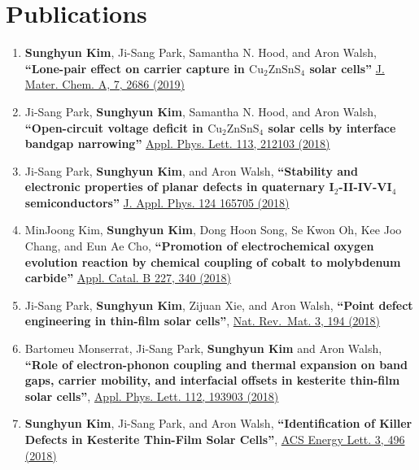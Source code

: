 \section{Publications}\label{publications}

\begin{enumerate}
\def\labelenumi{\arabic{enumi}.}
\item
  \textbf{Sunghyun Kim}, Ji-Sang Park, Samantha N. Hood, and Aron Walsh,
  \textbf{``Lone-pair effect on carrier capture in
  \(\boldsymbol{\mathrm{Cu_{2}ZnSnS_{4}}}\) solar cells''}
  \href{https://pubs.rsc.org/en/content/articlelanding/2019/ta/c8ta10130b}{J.
  Mater. Chem. A, 7, 2686 (2019)}
\item
  Ji-Sang Park, \textbf{Sunghyun Kim}, Samantha N. Hood, and Aron Walsh,
  \textbf{``Open-circuit voltage deficit in
  \(\boldsymbol{\mathrm{Cu_{2}ZnSnS_{4}}}\) solar cells by interface
  bandgap narrowing''}
  \href{https://aip.scitation.org/doi/abs/10.1063/1.5063793}{Appl. Phys.
  Lett. 113, 212103 (2018)}
\item
  Ji-Sang Park, \textbf{Sunghyun Kim}, and Aron Walsh,
  \textbf{``Stability and electronic properties of planar defects in
  quaternary I\(_2\)-II-IV-VI\(_4\) semiconductors''}
  \href{https://doi.org/10.1063/1.5053424}{J. Appl. Phys. 124 165705
  (2018)}
\item
  MinJoong Kim, \textbf{Sunghyun Kim}, Dong Hoon Song, Se Kwon Oh, Kee
  Joo Chang, and Eun Ae Cho, \textbf{``Promotion of electrochemical
  oxygen evolution reaction by chemical coupling of cobalt to molybdenum
  carbide''} \href{https://doi.org/10.1016/j.apcatb.2018.01.051}{Appl.
  Catal. B 227, 340 (2018)}
\item
  Ji-Sang Park, \textbf{Sunghyun Kim}, Zijuan Xie, and Aron Walsh,
  \textbf{``Point defect engineering in thin-film solar cells''},
  \href{https://doi.org/10.1038/s41578-018-0026-7}{Nat. Rev.~Mat. 3, 194
  (2018)}
\item
  Bartomeu Monserrat, Ji-Sang Park, \textbf{Sunghyun Kim} and Aron
  Walsh, \textbf{``Role of electron-phonon coupling and thermal
  expansion on band gaps, carrier mobility, and interfacial offsets in
  kesterite thin-film solar cells''},
  \href{https://doi.org/10.1063/1.5028186}{Appl. Phys. Lett. 112, 193903
  (2018)}
\item
  \textbf{Sunghyun Kim}, Ji-Sang Park, and Aron Walsh,
  \textbf{``Identification of Killer Defects in Kesterite Thin-Film
  Solar Cells''},
  \href{https://pubs.acs.org/doi/abs/10.1021/acsenergylett.7b01313}{ACS
  Energy Lett. 3, 496 (2018)}

\end{enumerate}

